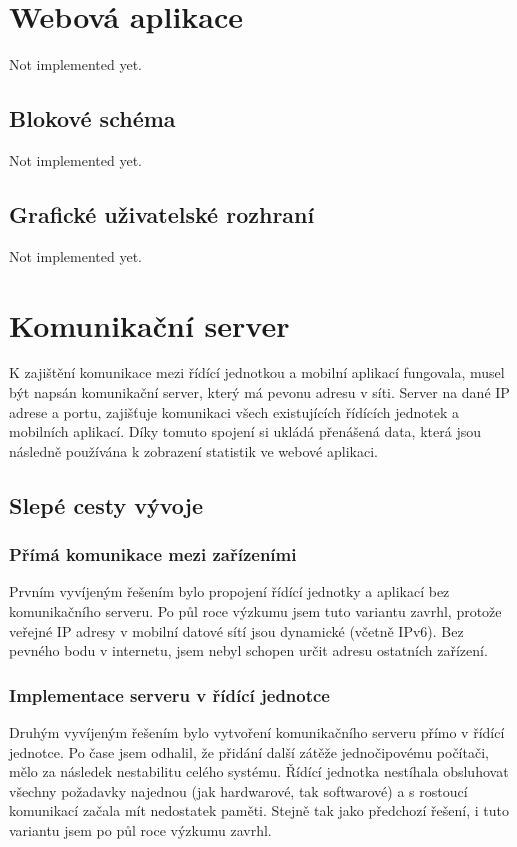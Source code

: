 \documentclass[FM,DP]{tulthesis}  %
\begin{document}

\chapter{Webová aplikace}
Not implemented yet.

\section{Blokové schéma}
Not implemented yet.

\section{Grafické uživatelské rozhraní}
Not implemented yet.


\chapter{Komunikační server}
K zajištění komunikace mezi řídící jednotkou a mobilní aplikací fungovala, musel být napsán komunikační server, který má pevonu adresu v síti. Server na dané IP adrese a portu, zajišťuje komunikaci všech existujících řídících jednotek a mobilních aplikací. Díky tomuto spojení si ukládá přenášená data, která jsou následně používána k zobrazení statistik ve webové aplikaci.

\section{Slepé cesty vývoje}

\subsection{Přímá komunikace mezi zařízeními}
Prvním vyvíjeným řešením bylo propojení řídící jednotky a aplikací bez komunikačního serveru. Po půl roce výzkumu jsem tuto variantu zavrhl, protože veřejné IP adresy v mobilní datové sítí jsou dynamické (včetně IPv6). Bez pevného bodu v internetu, jsem nebyl schopen určit adresu ostatních zařízení.

\subsection{Implementace serveru v řídící jednotce}
Druhým vyvíjeným řešením bylo vytvoření komunikačního serveru přímo v řídící jednotce. Po čase jsem odhalil, že přidání další zátěže jednočipovému počítači, mělo za následek nestabilitu celého systému. Řídící jednotka nestíhala obsluhovat všechny požadavky najednou (jak hardwarové, tak softwarové) a s rostoucí komunikací začala mít nedostatek paměti. Stejně tak jako předchozí řešení, i tuto variantu jsem po půl roce výzkumu zavrhl.
\end{document}
